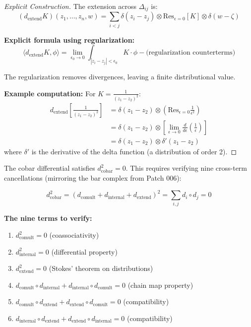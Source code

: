 \begin{proof}[Explicit Construction]
The extension across $\Delta_{ij}$ is:
\[
(d_{\text{extend}}K)(z_1, \ldots, z_n, w) = \sum_{i<j} \delta(z_i - z_j) \otimes 
\text{Res}_{\epsilon=0}[K] \otimes \delta(w - \zeta)
\]

\textbf{Explicit formula using regularization:}
$$\langle d_{\text{extend}}K, \phi \rangle = \lim_{\epsilon_0 \to 0} \int_{|z_i - z_j| 
< \epsilon_0} K \cdot \phi - \text{(regularization counterterms)}$$

The regularization removes divergences, leaving a finite distributional value.

\textbf{Example computation:} For $K = \frac{1}{(z_1 - z_2)^2}$:
\begin{align*}
d_{\text{extend}}\left[\frac{1}{(z_1 - z_2)^2}\right] &= 
\delta(z_1 - z_2) \otimes \left(\text{Res}_{\epsilon=0}\frac{1}{\epsilon^2}\right) \\
&= \delta(z_1 - z_2) \otimes \left[\lim_{\epsilon \to 0} \frac{d}{d\epsilon}\left(
\frac{1}{\epsilon}\right)\right] \\
&= \delta(z_1 - z_2) \otimes \delta'(z_1 - z_2)
\end{align*}
where $\delta'$ is the derivative of the delta function (a distribution of order 2).
\end{proof}

\begin{theorem}[Verification of $d_{\text{cobar}}^2 = 0$]\label{thm:cobar-d-squared-zero}
The cobar differential satisfies $d_{\text{cobar}}^2 = 0$. This requires verifying 
nine cross-term cancellations (mirroring the bar complex from Patch 006):

$$d_{\text{cobar}}^2 = (d_{\text{comult}} + d_{\text{internal}} + d_{\text{extend}})^2 
= \sum_{i,j} d_i \circ d_j = 0$$

\textbf{The nine terms to verify:}
\begin{enumerate}
\item $d_{\text{comult}}^2 = 0$ (coassociativity)
\item $d_{\text{internal}}^2 = 0$ (differential property)
\item $d_{\text{extend}}^2 = 0$ (Stokes' theorem on distributions)
\item $d_{\text{comult}} \circ d_{\text{internal}} + d_{\text{internal}} \circ 
d_{\text{comult}} = 0$ (chain map property)
\item $d_{\text{comult}} \circ d_{\text{extend}} + d_{\text{extend}} \circ 
d_{\text{comult}} = 0$ (compatibility)
\item $d_{\text{internal}} \circ d_{\text{extend}} + d_{\text{extend}} \circ 
d_{\text{internal}} = 0$ (compatibility)
\end{enumerate}
\end{theorem}

